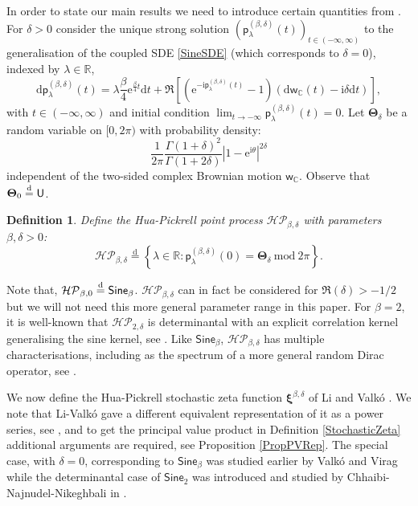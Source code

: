 \documentclass[]{article}
\newtheorem{defn}[thm]{Definition}
\begin{document}
In order to state our main results we need to introduce certain quantities from \cite{ValkoViragOperators,LiValko}. For $\delta>0$ consider the unique strong solution $(\mathsf{p}_\lambda^{(\beta,\delta)}(t))_{t\in (-\infty,\infty)}$ to the generalisation of the coupled SDE \eqref{SineSDE} (which corresponds to $\delta=0$), indexed by $\lambda\in \mathbb{R}$,
\begin{equation}
\mathrm{d}\mathsf{p}_\lambda^{(\beta,\delta)}(t)=\lambda \frac{\beta}{4}\mathrm{e}^{\frac{\beta}{4}t}\mathrm{d}t+\Re\left[\left(\mathrm{e}^{-\mathrm{i}\mathsf{p}_\lambda^{(\beta,\delta)}(t)}-1\right)\left(\mathrm{d}\mathsf{w}_\mathbb{C}(t)-\mathrm{i}\delta\mathrm{d}t\right)\right],
\end{equation}
 with $t \in (-\infty,\infty)$ and initial condition $\lim_{t \to -\infty} \mathsf{p}_\lambda^{(\beta,\delta)}(t)=0$. Let $\boldsymbol{\Theta}_\delta$ be a random variable on $[0,2\pi)$ with probability density:
\begin{equation*}
\frac{1}{2\pi} \frac{\Gamma(1+\delta)^2}{\Gamma(1+2\delta)} \left|1-\mathrm{e}^{\mathrm{i}\theta}\right|^{2\delta}
\end{equation*}
independent of the two-sided complex Brownian motion $\mathsf{w}_{\mathbb{C}}$. Observe that $\boldsymbol{\Theta}_0\overset{\textnormal{d}}{=}\mathsf{U}$.
\begin{defn}
Define the Hua-Pickrell point process $\mathcal{HP}_{\beta,\delta}$ with parameters $\beta,\delta >0$:
\begin{equation}
\mathcal{HP}_{\beta,\delta}\overset{\mathrm{d}}{=}\left\{\lambda \in \mathbb{R}:\mathsf{p}^{(\beta,\delta)}_\lambda(0)=\boldsymbol{\Theta}_\delta \ \mathrm{mod} \ 2\pi\right\}.
\end{equation}
\end{defn}
Note that, $\mathcal{HP}_{\beta,0}\overset{\textnormal{d}}{=}\mathsf{Sine}_\beta$. $\mathcal{HP}_{\beta,\delta}$ can in fact be considered for $\Re(\delta)>-1/2$ but we will not need this more general parameter range in this paper. For $\beta=2$, it is well-known that $\mathcal{HP}_{2,\delta}$ is determinantal with an explicit correlation kernel generalising the sine kernel, see \cite{BorodinOlshanski,ForresterWitte}. Like $\mathsf{Sine}_\beta$, $\mathcal{HP}_{\beta,\delta}$ has multiple characterisations, including as the spectrum of a more general random Dirac operator, see \cite{ValkoViragOperators,LiValko}.

We now define the Hua-Pickrell stochastic zeta function $\boldsymbol{\xi}^{\beta,\delta}$ of Li and Valk\'{o} \cite{LiValko}. We note that Li-Valk\'{o} gave a different equivalent representation of it as a power series, see \cite{LiValko}, and to get the principal value product in Definition \ref{StochasticZeta} additional arguments are required, see Proposition \ref{PropPVRep}. The special case, with $\delta=0$, corresponding to $\mathsf{Sine}_\beta$ was studied earlier by Valk\'{o} and Virag \cite{ValkoVirag} while the determinantal case of $\mathsf{Sine}_2$ was introduced and studied by Chhaibi-Najnudel-Nikeghbali in \cite{CNN}.
\end{document}
